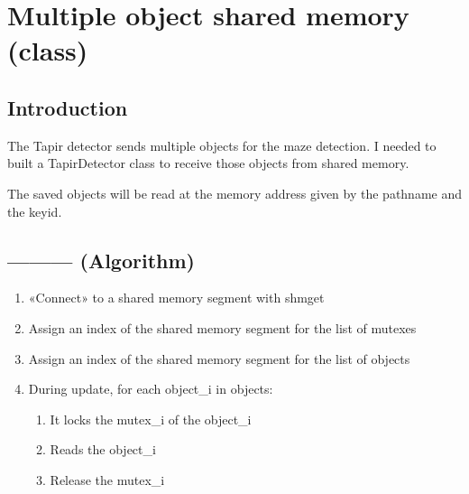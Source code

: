 \section{Multiple object shared memory (class)}

\subsection{Introduction}

The Tapir detector sends multiple objects for the maze detection. I 
needed to built a TapirDetector class to receive those objects from 
shared memory.

The saved objects will be read at the memory address given by the 
pathname and the keyid.

\subsection{--------- (Algorithm)}

    \begin{enumerate}
        \item «Connect» to a shared memory segment with shmget
        \item Assign an index of the shared memory segment for the list 
            of mutexes 
        \item Assign an index of the shared memory segment for the list 
            of objects 
        \item During update, for each object\_i in objects:
        \begin{enumerate}
            \item It locks the mutex\_i of the object\_i
            \item Reads the object\_i
            \item Release the mutex\_i
        \end{enumerate}
    \end{enumerate}

